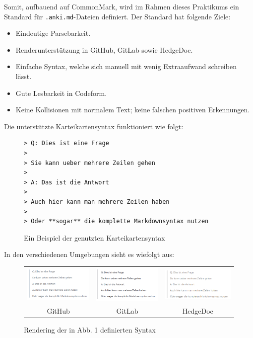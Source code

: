 \documentclass[ngerman]{article}
\begin{document}
Somit, aufbauend auf CommonMark, wird im Rahmen dieses Praktikums ein Standard für \texttt{.anki.md}-Dateien definiert. Der Standard hat folgende Ziele:
\begin{itemize}
  \item Eindeutige Parsebarkeit.
  \item Renderunterstützung in GitHub, GitLab sowie HedgeDoc.
  \item Einfache Syntax, welche sich manuell mit wenig Extraaufwand schreiben lässt.
  \item Gute Lesbarkeit in Codeform.
  \item Keine Kollisionen mit normalem Text; keine falschen positiven Erkennungen.
\end{itemize}

Die unterstützte Karteikartensyntax funktioniert wie folgt:
\begin{figure}[H]
\centering
\begin{lstlisting}
> Q: Dies ist eine Frage
>
> Sie kann ueber mehrere Zeilen gehen
>
> A: Das ist die Antwort
>
> Auch hier kann man mehrere Zeilen haben
>
> Oder **sogar** die komplette Markdownsyntax nutzen
\end{lstlisting}
  \caption{Ein Beispiel der genutzten Karteikartensyntax}
\end{figure}
In den verschiedenen Umgebungen sieht es wiefolgt aus:

\begin{figure}[H]
\centering
\begin{tabular}{ccc}
\includegraphics[width=50mm]{./figures/GH_Syntax1} & \includegraphics[width=50mm]{./figures/GL_Syntax1} & \includegraphics[width=50mm]{./figures/HD_Syntax1} \\
GitHub & GitLab & HedgeDoc \\
\end{tabular}
\caption{Rendering der in Abb. 1 definierten Syntax}
\end{figure}
\end{document}
